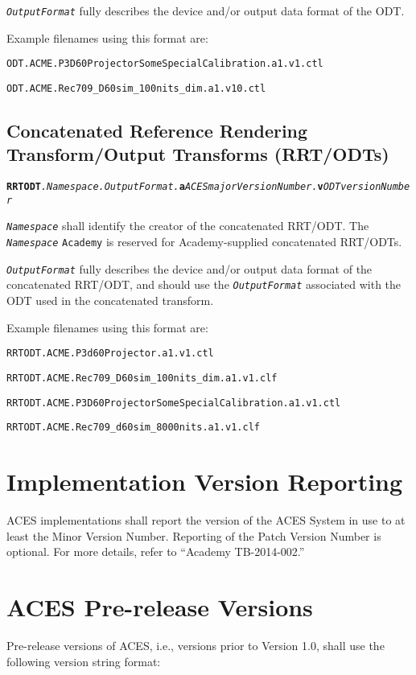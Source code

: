 \texttt{\textit{OutputFormat}} fully describes the device and/or output data format of the ODT.

Example filenames using this format are:
\begin{listize}
	\item \texttt{ODT.ACME.P3D60ProjectorSomeSpecialCalibration.a1.v1.ctl}
	\item \texttt{ODT.ACME.Rec709\_D60sim\_100nits\_dim.a1.v10.ctl}
\end{listize}

\subsection{Concatenated Reference Rendering Transform/Output Transforms (RRT/ODTs)} \label{sec:rrtodt}

\texttt{\textbf{RRTODT}\textit{.Namespace.OutputFormat.}\textbf{a}\textit{ACESmajorVersionNumber.}\textbf{v}\textit{ODTversionNumber}}

\texttt{\textit{Namespace}} shall identify the creator of the concatenated RRT/ODT. The \texttt{\textit{Namespace}} \texttt{Academy} is reserved for Academy-supplied concatenated RRT/ODTs.

\texttt{\textit{OutputFormat}} fully describes the device and/or output data format of the concatenated RRT/ODT, and should use the \texttt{\textit{OutputFormat}} associated with the ODT used in the concatenated transform. 

Example filenames using this format are: 
\begin{listize}
	\item \texttt{RRTODT.ACME.P3d60Projector.a1.v1.ctl}
	\item \texttt{RRTODT.ACME.Rec709\_D60sim\_100nits\_dim.a1.v1.clf}
	\item \texttt{RRTODT.ACME.P3D60ProjectorSomeSpecialCalibration.a1.v1.ctl}
	\item \texttt{RRTODT.ACME.Rec709\_d60sim\_8000nits.a1.v1.clf}
\end{listize}

\section{Implementation Version Reporting}
ACES implementations shall report the version of the ACES System in use to at least the Minor Version Number.  Reporting of the Patch Version Number is optional. For more details, refer to ``Academy TB-2014-002.''

\section{ACES Pre-release Versions}
Pre-release versions of ACES, i.e., versions prior to Version 1.0, shall use the following version string format:

